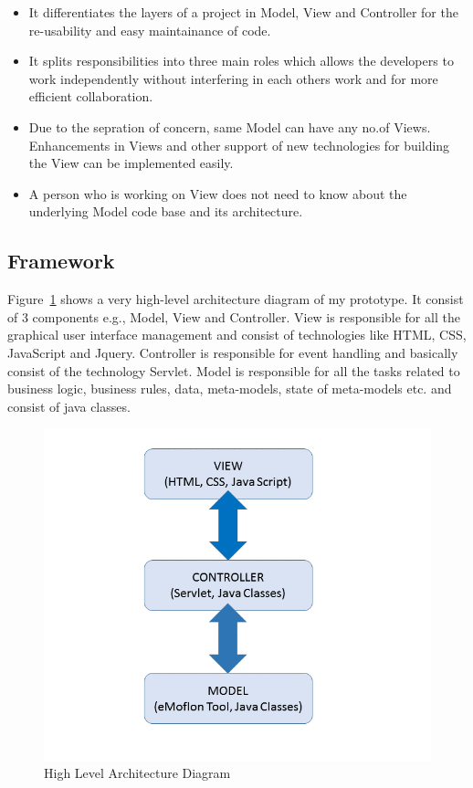 \begin{itemize}
	\item {It differentiates the layers of a project in Model, View and Controller for the re-usability and easy maintainance of code.}
	\item {It splits responsibilities into three main roles which allows the developers to work independently without interfering in each others work and for more efficient collaboration.}
	\item {Due to the sepration of concern, same Model can have any no.of Views. Enhancements in Views and other support of new technologies for building the View can be implemented easily.}
	\item {A person who is working on View does not need to know about the underlying Model code base and its architecture.}
\end{itemize}

\subsection{Framework}\label{subsec:framework}
Figure~\ref{fig:Architecture_Diagram} shows a very high-level architecture diagram of my prototype. It consist of 3 components e.g., Model, View and Controller. View is responsible for all the graphical user interface management and consist of technologies like HTML, CSS, JavaScript and Jquery. Controller is responsible for event handling and basically consist of the technology Servlet. Model is responsible for all the tasks related to business logic, business rules, data, meta-models, state of meta-models etc. and consist of java classes.

\begin{figure}
	\includegraphics[width=1\textwidth]{figures/Highlevel_Arch}
	\caption{High Level Architecture Diagram}
	\label{fig:Architecture_Diagram}
\end{figure}

